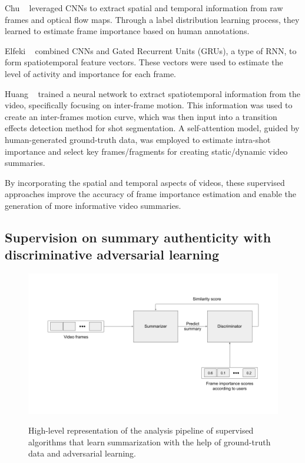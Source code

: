 Chu \etal~\cite{chu2019spatiotemporal} leveraged CNNs to extract spatial and temporal information from raw frames and optical flow maps. Through a label distribution learning process, they learned to estimate frame importance based on human annotations. 

Elfeki \etal~\cite{elfeki2019video} combined CNNs and Gated Recurrent Units (GRUs), a type of RNN, to form spatiotemporal feature vectors. These vectors were used to estimate the level of activity and importance for each frame.

Huang \etal~\cite{huang2019novel} trained a neural network to extract spatiotemporal information from the video, specifically focusing on inter-frame motion. This information was used to create an inter-frames motion curve, which was then input into a transition effects detection method for shot segmentation. A self-attention model, guided by human-generated ground-truth data, was employed to estimate intra-shot importance and select key frames/fragments for creating static/dynamic video summaries.

By incorporating the spatial and temporal aspects of videos, these supervised approaches improve the accuracy of frame importance estimation and enable the generation of more informative video summaries.

\subsection{Supervision on summary authenticity with discriminative adversarial learning}
\label{subsec:rel-sup-discriminative}

\begin{figure}[ht]
  \caption{High-level representation of the analysis pipeline of supervised algorithms that learn summarization with the help of ground-truth data and adversarial learning.}
  \includegraphics[width=0.73\paperwidth]{content/related/figures/sup-gan.png}
  \label{figure:rel-sup-gan}
\end{figure}

